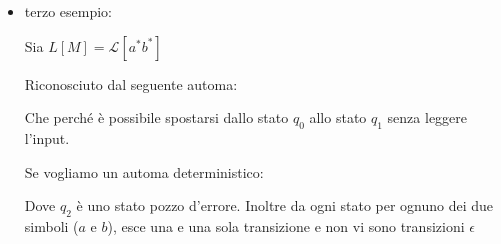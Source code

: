 {\begin{itemize}
\begin{center}
        \end{center}

        Si noti che $ba\in L[M]$ (ovvero $ba$ appartiene al linguaggio riconosciuto dall'automa $M$)  perché esiste un cammino da $q_0$ a $q_2$ etichettato $ba$

        Questo linguaggio è :
        \begin{itemize}
            \item $(q_0, b)$ offre 2 mosse o su $q_0$ o su $q_1$
            \item $(q_1, b)$ non offre mosse
            \item $(q_2, a/b)$ non offre mosse 
        \end{itemize}

        \item terzo esempio:
        
        Sia $L[M]=\mathcal{L}[a^*b^*]$

        Riconosciuto dal seguente automa:
        \begin{center}
        \end{center}

        Che  perché è possibile spostarsi dallo stato $q_0$ allo stato $q_1$ senza leggere l'input. 
        
        Se vogliamo un automa deterministico:
        \begin{center}
        \end{center}   
        Dove $q_2$ è uno stato pozzo d'errore. Inoltre da ogni stato per ognuno dei due simboli ($a$ e $b$), esce una e una sola transizione e non vi sono transizioni $\epsilon$

        
    \end{itemize}
}
